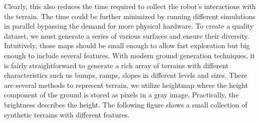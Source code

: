 \documentclass[../document.tex]{subfiles}
\begin{document}
Clearly, this also reduces the time required to collect the robot's interactions with the terrain. The time could be further minimized by running different simulations in parallel bypassing the demand for more physical hardware.
To create a quality dataset, we must generate a series of various surfaces and ensure their diversity. Intuitively, those maps should be small enough to allow fast exploration but big enough to include several features. With modern ground generation techniques, it is fairly straightforward to generate a rich array of terrains with different characteristics such us bumps, ramps, slopes in different levels and sizes. There are several methods to represent terrain, we utilize heightmap where the height component of the ground is stored as pixels in a gray image. Practically, the brightness describes the height. The following figure shows a small collection of synthetic terrains with different features.
\end{document}
